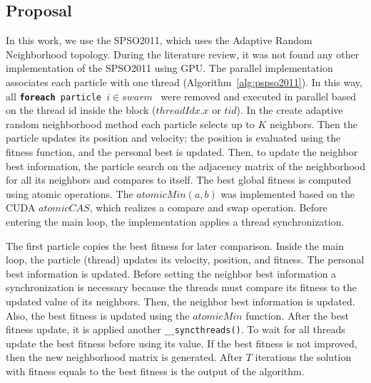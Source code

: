 \documentclass[conference]{IEEEtran}
\begin{document}
    \subsection{Proposal}

    In this work, we use the SPSO2011, which uses the Adaptive Random Neighborhood topology.  
    During the literature review, it was not found any other implementation of the SPSO2011 using GPU.
    The parallel implementation associates each particle with one thread (Algorithm~\ref{alg:pspso2011}).
    In this way, all \texttt{{\bf foreach} particle $ i \in swarm$ } were removed and executed in parallel based on the thread id inside the block ($threadIdx.x$ or $tid$).
    In the create adaptive random neighborhood method each particle selects up to $K$ neighbors. Then the particle updates its position and velocity; the position is evaluated using the fitness function, and the personal best is updated.
    Then, to update the neighbor best information, the particle search on the adjacency matrix of the neighborhood for all its neighbors and compares to itself.
    The best global fitness is computed using atomic operations. The $atomicMin(a, b)$ was implemented based on the CUDA $atomicCAS$, which realizes a compare and swap operation.
    Before entering the main loop, the implementation applies a thread synchronization.

    The first particle copies the best fitness for later comparison.
    Inside the main loop, the particle (thread) updates its velocity, position, and fitness.
    The personal best information is updated.
    Before setting the neighbor best information a synchronization is necessary because the threads must compare its fitness to the updated value of its neighbors.
    Then, the neighbor best information is updated. Also, the best fitness is updated using the $atomicMin$ function.
    After the best fitness update, it is applied another \texttt{\_\_syncthreads()}. To wait for all threads update the best fitness before using its value.
    If the best fitness is not improved, then the new neighborhood matrix is generated.
    After $T$ iterations the solution with fitness equals to the best fitness is the output of the algorithm.
\end{document}
